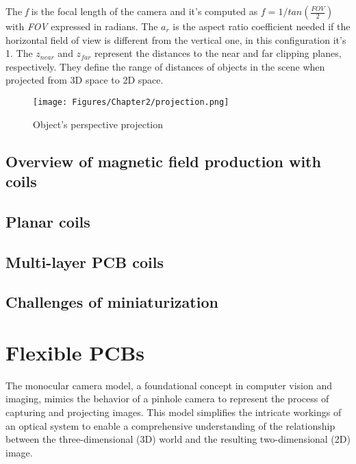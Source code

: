 The \textit{f} is the focal length of the camera and it's computed as $f = 1/tan(\frac{FOV}{2})$ with \textit{FOV} expressed in radians. The $a_{r}$ is the aspect ratio coefficient needed if the horizontal field of view is different from the vertical one, in this configuration it's 1. The $z_{near}$ and $z_{far}$ represent the distances to the near and far clipping planes, respectively. They define the range of distances of objects in the scene when projected from 3D space to 2D space.

\begin{figure}[th]
    \centering
    \texttt{[image: Figures/Chapter2/projection.png]}
    \caption[Perspective projection of an object]{Object's perspective projection}
    \label{fig:Opp}
\end{figure}

\subsection{Overview of magnetic field production with coils}

\subsection{Planar coils}

\subsection{Multi-layer PCB coils}

\subsection{Challenges of miniaturization}


\section{Flexible PCBs}
The monocular camera model, a foundational concept in computer vision and imaging, mimics the behavior of a pinhole camera to represent the process of capturing and projecting images. This model simplifies the intricate workings of an optical system to enable a comprehensive understanding of the relationship between the three-dimensional (3D) world and the resulting two-dimensional (2D) image.

